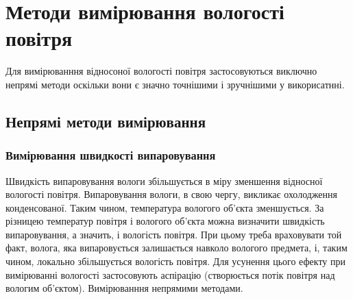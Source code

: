 \chapter{Методи вимірювання вологості повітря}

Для вимірюванння відносоної вологості повітря застосовуються виключно непрямі методи оскільки вони є
значно точнішими і зручнішими у викорисатнні.

\section{Непрямі методи вимірювання}

\subsection{Вимірювання швидкості випаровування}

Швидкість випаровування вологи збільшується в міру зменшення відносної вологості повітря.
Випаровування вологи, в свою чергу, викликає охолодження конденсованої. Таким чином, температура
вологого об'єкта зменшується. За різницею температур повітря і вологого об'єкта можна визначити
швидкість випаровування, а значить, і вологість повітря. При цьому треба враховувати той факт,
волога, яка випаровується залишається навколо вологого предмета, і, таким чином, локально
збільшується вологість повітря. Для усунення цього ефекту при вимірюванні вологості застосовують
аспірацію (створюється потік повітря над вологим об'єктом). Вимірюванння непрямими методами.
